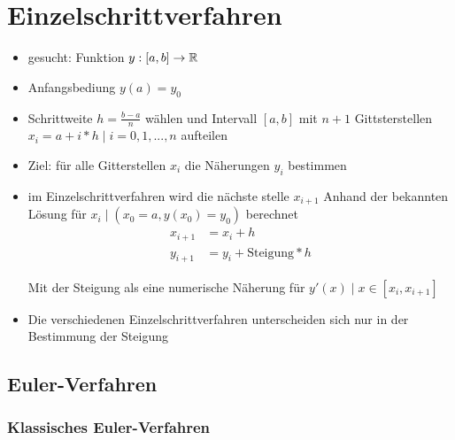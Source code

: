 \section{Einzelschrittverfahren}

\begin{itemize}
	\item gesucht: Funktion $y : [a, b] \to \mathbb{R}$
	\item Anfangsbediung $y(a) = y_0$
	\item Schrittweite $h = \frac{b-a}{n}$ wählen und Intervall $[a,b]$
	      mit $n+1$ Gittsterstellen $x_i = a + i*h \; | \; i = 0,1,...,n$
	      aufteilen
	\item Ziel: für alle Gitterstellen $x_i$ die Näherungen $y_i$ bestimmen
	\item im Einzelschrittverfahren wird die nächste stelle $x_{i+1}$ Anhand
	      der bekannten Lösung für $x_i \; | \; (x_0 = a, y(x_0) = y_0)$ berechnet
	      \begin{align*}
              x_{i+1} &= x_i + h\\
              y_{i+1} &= y_i + \mathrm{Steigung} * h
	      \end{align*}

          Mit der Steigung als eine numerische Näherung für 
          $y'(x) \; | \; x \in [x_i, x_{i+1}]$
    \item Die verschiedenen Einzelschrittverfahren unterscheiden sich nur
        in der Bestimmung der Steigung
\end{itemize}



\subsection{Euler-Verfahren}


\subsubsection{Klassisches Euler-Verfahren}







